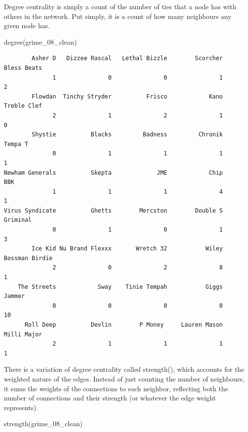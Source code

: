 \documentclass[
  letterpaper,
  DIV=11,
  numbers=noendperiod]{scrreprt}
\newenvironment{Shaded}{\begin{snugshade}}{\end{snugshade}}
\newcommand{\FunctionTok}[1]{\textcolor[rgb]{0.28,0.35,0.67}{#1}}
\newcommand{\NormalTok}[1]{\textcolor[rgb]{0.00,0.23,0.31}{#1}}
\begin{document}
Degree centrality is simply a count of the number of ties that a node
has with others in the network. Put simply, it is a count of how many
neighbours any given node has.

\begin{Shaded}
\begin{Highlighting}[]
\FunctionTok{degree}\NormalTok{(grime\_08\_clean)}
\end{Highlighting}
\end{Shaded}

\begin{verbatim}
        Asher D   Dizzee Rascal   Lethal Bizzle        Scorcher     Bless Beats 
              1               0               0               1               2 
        Flowdan  Tinchy Stryder          Frisco            Kano     Treble Clef 
              2               1               2               1               0 
        Shystie          Blacks         Badness         Chronik         Tempa T 
              0               1               1               1               1 
Newham Generals          Skepta             JME            Chip             BBK 
              1               1               1               4               1 
Virus Syndicate          Ghetts        Mercston        Double S        Griminal 
              0               1               0               1               3 
        Ice Kid Nu Brand Flexxx       Wretch 32           Wiley  Bossman Birdie 
              2               0               2               8               1 
    The Streets            Sway    Tinie Tempah           Giggs          Jammer 
              0               0               0               0              10 
      Roll Deep          Devlin        P Money     Lauren Mason     Milli Major 
              2               1               1               1               1 
\end{verbatim}

There is a variation of degree centrality called strength(), which
accounts for the weighted nature of the edges. Instead of just counting
the number of neighbours, it sums the weights of the connections to each
neighbor, reflecting both the number of connections and their strength
(or whatever the edge weight represents).

\begin{Shaded}
\begin{Highlighting}[]
\FunctionTok{strength}\NormalTok{(grime\_08\_clean)}
\end{Highlighting}
\end{Shaded}
\end{document}
